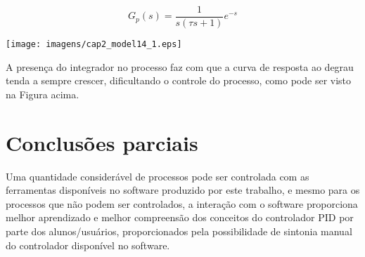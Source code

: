     \begin{equation}
        \label{eq14}
        G_p(s) = \frac{1}{s(\tau s + 1)}e^{-s}
    \end{equation}
    
    \begin{center}
        \texttt{[image: imagens/cap2\_model14\_1.eps]}
        \label{cap2_26}
    \end{center}

    A presença do integrador no processo faz com que a curva de resposta ao degrau tenda
    a sempre crescer, dificultando o controle do processo, como pode ser visto na Figura acima.

\section{Conclusões parciais}

    Uma quantidade considerável de processos pode ser controlada com as ferramentas
    disponíveis no software produzido por este trabalho, e mesmo para os processos
    que não podem ser controlados, a interação com o software proporciona melhor
    aprendizado e melhor compreensão dos conceitos do controlador \ac{PID}
    por parte dos alunos/usuários, proporcionados pela possibilidade de sintonia
    manual do controlador disponível no software.
